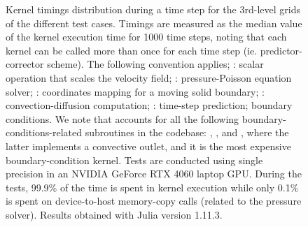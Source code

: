 \documentclass[10pt,a4paper]{article}
\begin{document}
\begin{figure}[!t]
\begin{subfigure}[t]{0.32\linewidth}
    \centering
  \end{subfigure}
  \caption{Kernel timings distribution during a time step for the 3rd-level grids of the different test cases. Timings are measured as the median value of the kernel execution time for 1000 time steps, noting that each kernel can be called more than once for each time step (ie. predictor-corrector scheme). The following convention applies; : scalar operation that scales the velocity field; : pressure-Poisson equation solver; : coordinates mapping for a moving solid boundary; : convection-diffusion computation; : time-step prediction;  boundary conditions. We note that  accounts for all the following boundary-conditions-related subroutines in the codebase: , , and , where the latter implements a convective outlet, and it is the most expensive boundary-condition kernel. Tests are conducted using single precision in an NVIDIA GeForce RTX 4060 laptop GPU. During the tests, 99.9\% of the time is spent in kernel execution while only 0.1\% is spent on device-to-host memory-copy calls (related to the pressure solver). Results obtained with Julia version 1.11.3.}
\label{fig:profiling}
\end{figure}
\end{document}
